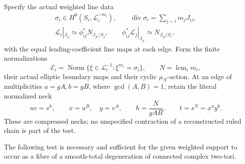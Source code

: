 \begin{proposition}
Specify the actual weighted line data
\[
 \begin{gathered}
 \sigma_i\in H^0(S_i,\mathcal L_i^{-m_i}),\qquad
 \operatorname{div}\sigma_i=\sum_{j\sim i}m_jJ_{ij},\\
 \mathcal L_i|_{J_{ij}}\simeq
       \phi_{ij}^{*}N_{J_{ji}/S_j},\qquad
 \phi_{ij}^{*}\mathcal L_j|_{J_{ji}}
       \simeq N_{J_{ij}/S_i},
 \end{gathered}
 \tag{C.WT.1}\label{cdp:eq:C.WT.1}
\]
with the equal leading-coefficient line maps at each edge.
Form the finite normalizations
\[
 \mathcal E_i=\operatorname{Norm}
       \{\xi\in\mathcal L_i^{-1}:\xi^{m_i}=\sigma_i\},
 \qquad N=\operatorname{lcm}_i m_i,
 \tag{C.WT.2}\label{cdp:eq:C.WT.2}
\]
their actual elliptic boundary maps and their cyclic
\(\mu_N\)-action. At an edge of multiplicities \(a=gA,b=gB\),
where \(\gcd(A,B)=1\), retain the literal normalized neck
\[
       uv=s^h,\qquad x=u^B,\quad y=v^A,\qquad
       h=\frac{N}{gAB},\qquad t=s^N=x^a y^b.
 \tag{C.WT.3}\label{cdp:eq:C.WT.3}
\]
These are compressed necks; no unspecified contraction of a
reconstructed ruled chain is part of the test.

The following test is necessary and sufficient for the given
weighted support to occur as a fibre of a smooth-total
degeneration of connected complex two-tori.


\end{proposition}
